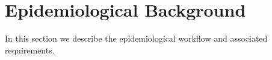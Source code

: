 \documentclass[journal]{style/vgtc} 			          %
\begin{document}


\section{Epidemiological Background} \label{MedicalAndTechnicalBackground}

In this section we describe the epidemiological workflow and associated requirements.
%
%
\end{document}
